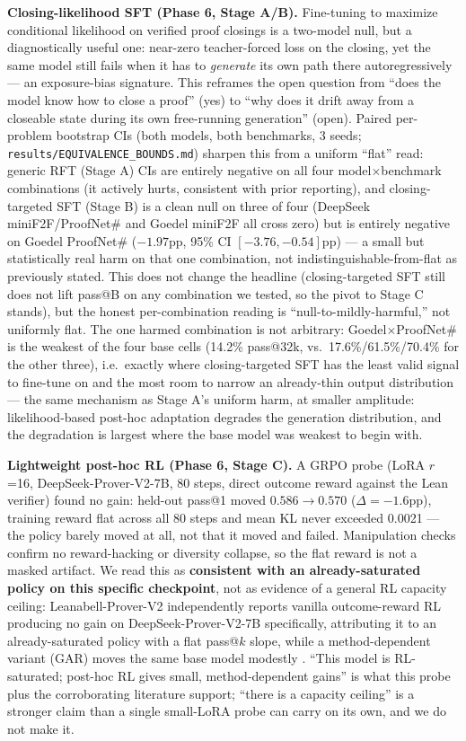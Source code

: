 \documentclass{article}
\begin{document}
\textbf{Closing-likelihood SFT (Phase 6, Stage A/B).} Fine-tuning to maximize conditional likelihood on
verified proof closings is a two-model null, but a diagnostically useful one: near-zero teacher-forced
loss on the closing, yet the same model still fails when it has to \emph{generate} its own path there
autoregressively --- an exposure-bias signature. This reframes the open question from ``does the model
know how to close a proof'' (yes) to ``why does it drift away from a closeable state during its own
free-running generation'' (open). Paired per-problem bootstrap CIs (both models, both benchmarks, 3
seeds; \texttt{results/EQUIVALENCE\_BOUNDS.md}) sharpen this from a uniform ``flat'' read: generic RFT
(Stage A) CIs are entirely negative on all four model$\times$benchmark combinations (it actively hurts,
consistent with prior reporting), and closing-targeted SFT (Stage B) is a clean null on three of four
(DeepSeek miniF2F/ProofNet\# and Goedel miniF2F all cross zero) but is entirely negative on Goedel
ProofNet\# ($-1.97$pp, 95\% CI $[-3.76,-0.54]$pp) --- a small but statistically real harm on that one
combination, not indistinguishable-from-flat as previously stated. This does not change the headline
(closing-targeted SFT still does not lift pass@B on any combination we tested, so the pivot to Stage C
stands), but the honest per-combination reading is ``null-to-mildly-harmful,'' not uniformly flat. The
one harmed combination is not arbitrary: Goedel$\times$ProofNet\# is the weakest of the four base cells
(14.2\% pass@32k, vs.\ 17.6\%/61.5\%/70.4\% for the other three), i.e.\ exactly where closing-targeted
SFT has the least valid signal to fine-tune on and the most room to narrow an already-thin output
distribution --- the same mechanism as Stage A's uniform harm, at smaller amplitude: likelihood-based
post-hoc adaptation degrades the generation distribution, and the degradation is largest where the base
model was weakest to begin with.

\textbf{Lightweight post-hoc RL (Phase 6, Stage C).} A GRPO probe (LoRA $r$=16, DeepSeek-Prover-V2-7B,
80 steps, direct outcome reward against the Lean verifier) found no gain: held-out pass@1 moved
$0.586 \to 0.570$ ($\Delta = -1.6$pp), training reward flat across all 80 steps and mean KL never
exceeded 0.0021 --- the policy barely moved at all, not that it moved and failed. Manipulation checks
confirm no reward-hacking or diversity collapse, so the flat reward is not a masked artifact. We read
this as \textbf{consistent with an already-saturated policy on this specific checkpoint}, not as
evidence of a general RL capacity ceiling: Leanabell-Prover-V2 independently reports vanilla
outcome-reward RL producing no gain on DeepSeek-Prover-V2-7B specifically, attributing it to an
already-saturated policy with a flat pass@$k$ slope, while a method-dependent variant (GAR) moves the
same base model modestly \citep{leanabell-prover-v2}. ``This model is RL-saturated; post-hoc RL gives
small, method-dependent gains'' is what this probe plus the corroborating literature support; ``there
is a capacity ceiling'' is a stronger claim than a single small-LoRA probe can carry on its own, and we
do not make it.
\end{document}
